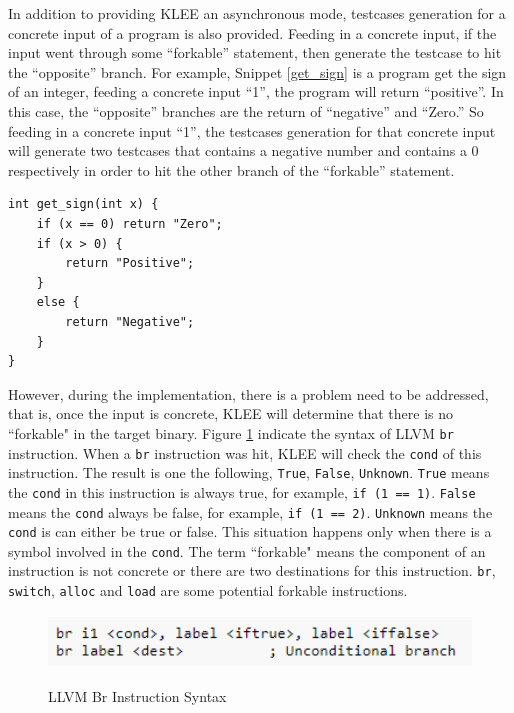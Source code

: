 In addition to providing KLEE an asynchronous mode, testcases generation for a concrete input of a program is also provided. Feeding in a concrete input, if the input went through some ``forkable'' statement, then generate the testcase to hit the ``opposite'' branch. For example, Snippet \ref{get_sign} is a program get the sign of an integer, feeding a concrete input ``1'', the program will return ``positive''. In this case, the ``opposite'' branches are the return of ``negative'' and ``Zero.'' So feeding in a concrete input ``1'', the testcases generation for that concrete input will generate two testcases that contains a negative number and contains a 0 respectively in order to hit the other branch of the ``forkable'' statement. 

\begin{spacing}{1}
{
\begin{lstlisting}[frame=shadowbox, caption={Get Sign},label={get_sign}]
int get_sign(int x) {
    if (x == 0) return "Zero";
    if (x > 0) {
        return "Positive";
    }
    else {
        return "Negative";
    }
}
\end{lstlisting}
}
\end{spacing}

However, during the implementation, there is a problem need to be addressed, that is, once the input is concrete, KLEE will determine that there is no ``forkable" in the target binary. Figure \ref{br_syntax} indicate the syntax of LLVM \texttt{br} instruction. When a \texttt{br} instruction was hit, KLEE will check the \texttt{cond} of this instruction. The result is one the following, \texttt{True}, \texttt{False}, \texttt{Unknown}. \texttt{True} means the \texttt{cond} in this instruction is always true, for example, \texttt{if (1 == 1)}. \texttt{False} means the \texttt{cond} always be false, for example, \texttt{if (1 == 2)}. \texttt{Unknown} means the \texttt{cond} is can either be true or false. This situation happens only when there is a symbol involved in the \texttt{cond}. The term ``forkable" means the component of an instruction is not concrete or there are two destinations for this instruction. \texttt{br}, \texttt{switch}, \texttt{alloc} and \texttt{load} are some potential forkable instructions.

\begin{figure}[h]%
\begin{center}
{\mbox{\includegraphics[height=40pt]{figures/LLVM_br_instruction_syntax.png}}}
\end{center}
\caption{\label{br_syntax}LLVM Br Instruction Syntax}
\end{figure}

